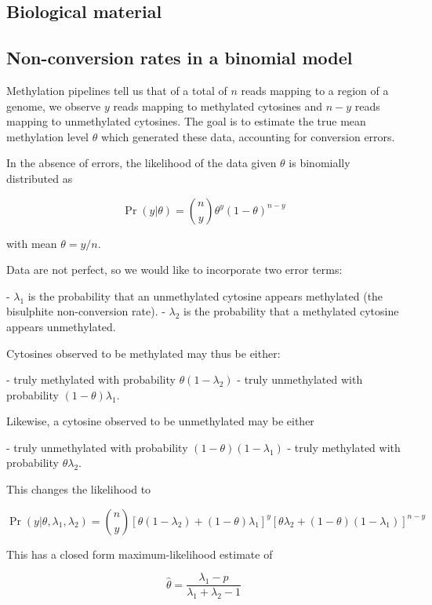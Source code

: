 \documentclass[useAMS,usenatbib]{tellus}
\begin{document}
\subsection{Biological material}

\subsection{Non-conversion rates in a binomial model}

Methylation pipelines tell us that of a total of $n$ reads mapping to a region of a genome, we observe $y$ reads mapping to methylated cytosines and $n-y$ reads mapping to unmethylated cytosines. The goal is to estimate the true mean methylation level $\theta$ which generated these data, accounting for conversion errors.

In the absence of errors, the likelihood of the data given $\theta$ is binomially distributed as

$$ \Pr(y| \theta) = {n \choose y} \theta^y(1-\theta)^{n-y}$$

with mean $\theta=y/n$.

Data are not perfect, so we would like to incorporate two error terms:

-   $\lambda_1$ is the probability that an unmethylated cytosine appears methylated (the bisulphite non-conversion rate).
-   $\lambda_2$ is the probability that a methylated cytosine appears unmethylated.

Cytosines observed to be methylated may thus be either:

-   truly methylated with probability $\theta(1-\lambda_2)$
-   truly unmethylated with probability $(1-\theta)\lambda_1$.

Likewise, a cytosine observed to be unmethylated may be either

-   truly unmethylated with probability $(1-\theta)(1-\lambda_1)$
-   truly methylated with probability $\theta \lambda_2$.

This changes the likelihood to

$$ \Pr(y | \theta, \lambda_1, \lambda_2) = 
{n \choose y}
[\theta(1-\lambda_2) + (1-\theta)\lambda_1]^y
[\theta \lambda_2 + (1-\theta)(1-\lambda_1)]^{n-y}
$$

This has a closed form maximum-likelihood estimate of

$$ \hat{\theta} = \frac{\lambda_1-p}{\lambda_1 + \lambda_2 -1} $$
\end{document}
